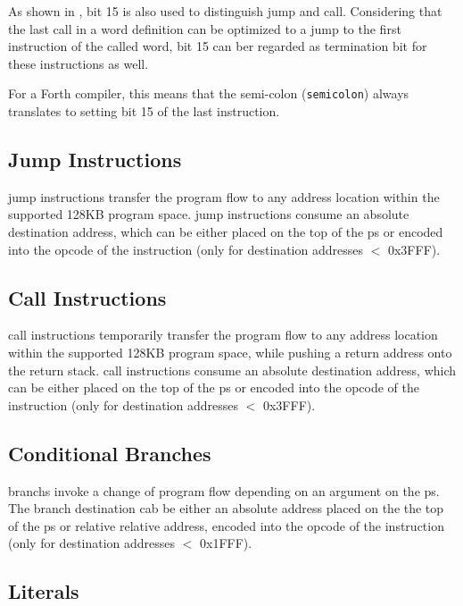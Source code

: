 As shown in , bit 15 is also used to distinguish jump
and call. Considering that the last call in a word definition can be optimized
to a jump to the first instruction of the called word, bit 15 can ber regarded
as termination bit for these instructions as well.

For a Forth compiler, this means that the semi-colon (\texttt{\gls{semicolon}})
always translates to setting bit 15 of the last instruction.

\subsection{Jump Instructions}
\label{opcodes:jump}

\Gls{jump} instructions transfer the program flow to any address
location within the supported 128KB program space. \Gls{jump} instructions consume an absolute
destination address, which can be either placed on the top of the \Gls{ps} or encoded
into the opcode of the instruction (only for destination addresses $<$ 0x3FFF).

\subsection{Call Instructions}
\label{opcodes:call}

\Gls{call} instructions temporarily transfer the program flow to any address
location within the supported 128KB program space, while pushing a return address onto
the return stack. \Gls{call} instructions consume an absolute
destination address, which can be either placed on the top of the \Gls{ps} or encoded
into the opcode of the instruction (only for destination addresses $<$ 0x3FFF).

\subsection{Conditional Branches}
\label{opcodes:branch}

\Glspl{branch} invoke a change of program flow depending on an argument on the
\gls{ps}. The branch destination cab be either an absolute address placed on the the top of  
the \Gls{ps} or relative relative address, encoded into the opcode of the instruction
(only for destination addresses $<$ 0x1FFF).

\subsection{Literals}
\label{opcodes:literal}


